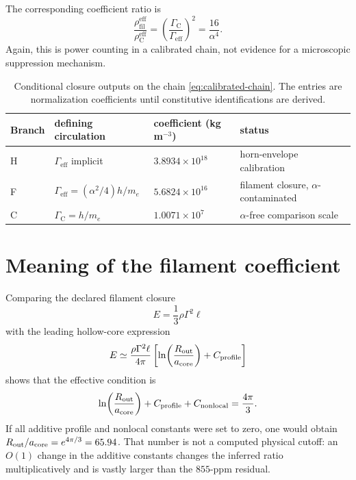 \documentclass[aps,pre,preprint,notitlepage,nofootinbib,superscriptaddress]{revtex4-2}
\newcommand{\rhofil}{\rho_{\mathrm{fil}}^{\mathrm{eff}}}
\newcommand{\rhoCeff}{\rho_{\mathrm C}^{\mathrm{eff}}}
\newcommand{\Gammaeff}{\Gamma_{\mathrm{eff}}}
\newcommand{\GammaC}{\Gamma_{\mathrm C}}
\begin{document}
The corresponding coefficient ratio is
\begin{equation}
  \frac{\rhofil}{\rhoCeff}
  =
  \left(\frac{\GammaC}{\Gammaeff}\right)^2
  =
  \frac{16}{\alpha^4}.
  \label{eq:rho-ratio-gamma}
\end{equation}
Again, this is power counting in a calibrated chain, not evidence for a microscopic suppression mechanism.

\begin{table}[t]
\caption{Conditional closure outputs on the chain \cref{eq:calibrated-chain}.  The entries are normalization coefficients until constitutive identifications are derived.}
\label{tab:closures}
\begin{ruledtabular}
\begin{tabular}{llll}
Branch & defining circulation & coefficient (kg\,m\(^{-3}\)) & status\\
\hline
H & \(\Gammaeff\) implicit & \(3.8934\times10^{18}\) & horn-envelope calibration\\
F & \(\Gammaeff=(\alpha^2/4)h/m_e\) & \(5.6824\times10^{16}\) & filament closure, \(\alpha\)-contaminated\\
C & \(\GammaC=h/m_e\) & \(1.0071\times10^{7}\) & \(\alpha\)-free comparison scale\\
\end{tabular}
\end{ruledtabular}
\end{table}

\section{Meaning of the filament coefficient}
\label{sec:line-coefficient}

Comparing the declared filament closure
\[
E=\frac13\rho\Gamma^2\ell
\]
with the leading hollow-core expression
\[
E
\simeq
\frac{\rho\Gamma^2\ell}{4\pi}
\left[
\ln\!\left(\frac{R_{\rm out}}{a_{\rm core}}\right)
+C_{\rm profile}
\right]
\]
shows that the effective condition is
\begin{equation}
  \ln\!\left(\frac{R_{\rm out}}{a_{\rm core}}\right)
  +C_{\rm profile}
  +C_{\rm nonlocal}
  =
  \frac{4\pi}{3}.
  \label{eq:effective-log}
\end{equation}
If all additive profile and nonlocal constants were set to zero, one would obtain \(R_{\rm out}/a_{\rm core}=e^{4\pi/3}=65.94\).  That number is not a computed physical cutoff: an \(O(1)\) change in the additive constants changes the inferred ratio multiplicatively and is vastly larger than the \(855\)-ppm residual.
\end{document}
